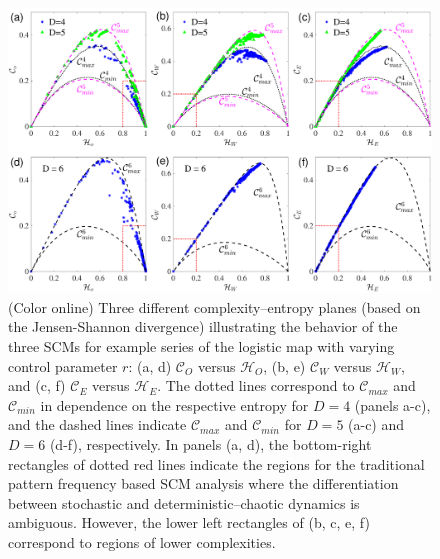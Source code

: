 \documentclass[aip,cha,reprint,nofootinbib]{revtex4-1}
\begin{document}
\begin{figure}
	\centering 
	\includegraphics[width=2\columnwidth]{CompEntropy_LogisticHC.pdf}
\caption{\small{(Color online) Three different complexity--entropy planes (based on the Jensen-Shannon divergence) illustrating the behavior of the three SCMs for example series of the logistic map with varying control parameter $r$: (a, d) $\mathcal{C}_O$ versus $\mathcal{H}_O$, (b, e) $\mathcal{C}_{W}$ versus $\mathcal{H}_{W}$, and (c, f) $\mathcal{C}_{E}$ versus $\mathcal{H}_{E}$. The {\color{red} dotted lines correspond to $\mathcal{C}_{max}$ and $\mathcal{C}_{min}$ in dependence on the respective entropy for $D=4$ (panels a-c), and the dashed lines indicate $\mathcal{C}_{max}$ and $\mathcal{C}_{min}$ for $D=5$ (a-c) and $D=6$ (d-f), respectively.} In panels (a, d), the bottom-right rectangles of dotted red lines indicate the regions for the traditional pattern frequency based SCM analysis where the differentiation between stochastic and deterministic--chaotic dynamics is ambiguous. However, the lower left rectangles of (b, c, e, f) correspond to regions of lower complexities. }  \label{fig:CElogistic}}
\end{figure}
\end{document}
